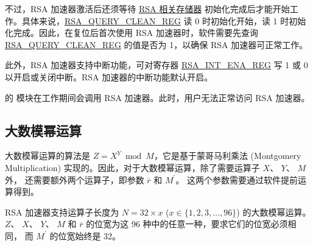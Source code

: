 \documentclass[main\_\_CN.tex]{subfiles}
\begin{document}
不过，RSA 加速器激活后还须等待 \hyperref[sec:mem-sum]{RSA 相关存储器} 初始化完成后才能开始工作。具体来说，\hyperref[regdesc:RSAQUERYCLEANREG]{RSA\_QUERY\_CLEAN\_REG} 读 0 时初始化开始，读 1 时初始化完成。因此，在复位后首次使用 RSA 加速器时，软件需要先查询 \hyperref[regdesc:RSAQUERYCLEANREG]{RSA\_QUERY\_CLEAN\_REG} 的值是否为 1，以确保 RSA 加速器可正常工作。

此外，RSA 加速器支持中断功能，可对寄存器 \hyperref[regdesc:RSAINTENAREG]{RSA\_INT\_ENA\_REG} 写 1 或 0 以开启或关闭中断。RSA 加速器的中断功能默认开启。

\begin{importantlisting}
\vspace{-0.5em}

    \chipname{} 的  模块在工作期间会调用 RSA 加速器。此时，用户无法正常访问 RSA 加速器。
\end{importantlisting}
\subsection{大数模幂运算} \label{sec:rsa-large-modular-Exponentiation}

大数模幂运算的算法是 \begin{math}Z = X^{Y} \bmod M\end{math}，它是基于蒙哥马利乘法 (Montgomery Multiplication) 实现的。因此，对于大数模幂运算，除了需要运算子
\begin{math}X\end{math}、
\begin{math}Y\end{math}、
\begin{math}M\end{math} 外，
还需要额外两个运算子，即参数
\begin{math}\overline{r}\end{math} 和
\begin{math}M^{\prime}\end{math}。
这两个参数需要通过软件提前运算得到。

RSA 加速器支持运算子长度为
\begin{math}N = 32 \times x\end{math} (\begin{math}x \in \{ 1,2,3, \dots, 96\} \end{math}) 的大数模幂运算。
\begin{math}Z\end{math}、
\begin{math}X\end{math}、
\begin{math}Y\end{math}、
\begin{math}M\end{math} 和
\begin{math}\overline{r}\end{math}
的位宽为这 96 种中的任意一种，要求它们的位宽必须相同，
而 \begin{math}M^{\prime}\end{math} 的位宽始终是 32。
\end{document}
